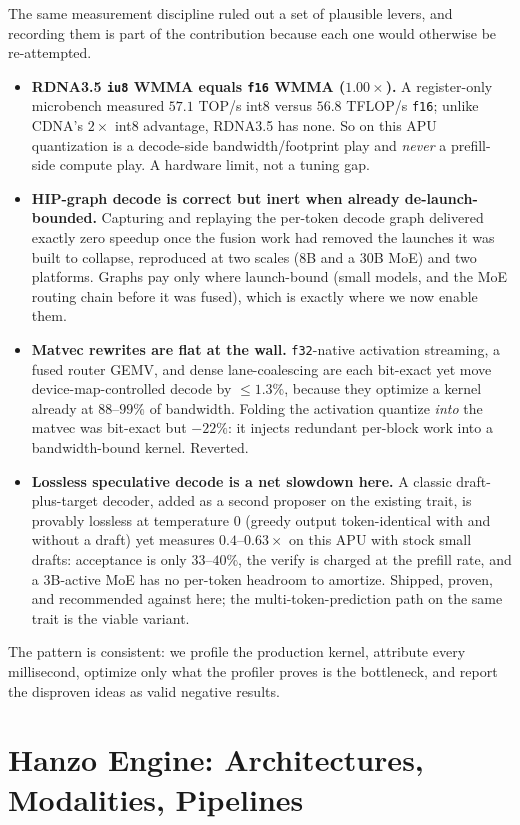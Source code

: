 \documentclass[11pt]{article}
\begin{document}
The same measurement discipline ruled out a set of plausible levers, and recording them is part of
the contribution because each one would otherwise be re-attempted.
\begin{itemize}
  \item \textbf{RDNA3.5 \texttt{iu8} WMMA equals \texttt{f16} WMMA ($1.00\times$).} A register-only
  microbench measured $57.1$ TOP/s int8 versus $56.8$ TFLOP/s \texttt{f16}; unlike CDNA's $2\times$
  int8 advantage, RDNA3.5 has none. So on this APU quantization is a decode-side bandwidth/footprint
  play and \emph{never} a prefill-side compute play. A hardware limit, not a tuning gap.
  \item \textbf{HIP-graph decode is correct but inert when already de-launch-bounded.} Capturing and
  replaying the per-token decode graph delivered exactly zero speedup once the fusion work had removed
  the launches it was built to collapse, reproduced at two scales ($8$B and a $30$B MoE) and two
  platforms. Graphs pay only where launch-bound (small models, and the MoE routing chain before it was
  fused), which is exactly where we now enable them.
  \item \textbf{Matvec rewrites are flat at the wall.} \texttt{f32}-native activation streaming, a
  fused router GEMV, and dense lane-coalescing are each bit-exact yet move device-map-controlled decode
  by $\leq 1.3\%$, because they optimize a kernel already at $88$--$99\%$ of bandwidth. Folding the
  activation quantize \emph{into} the matvec was bit-exact but $-22\%$: it injects redundant per-block
  work into a bandwidth-bound kernel. Reverted.
  \item \textbf{Lossless speculative decode is a net slowdown here.} A classic draft-plus-target
  decoder, added as a second proposer on the existing trait, is provably lossless at temperature $0$
  (greedy output token-identical with and without a draft) yet measures $0.4$--$0.63\times$ on this APU
  with stock small drafts: acceptance is only $33$--$40\%$, the verify is charged at the prefill rate,
  and a $3$B-active MoE has no per-token headroom to amortize. Shipped, proven, and recommended against
  here; the multi-token-prediction path on the same trait is the viable variant.
\end{itemize}
The pattern is consistent: we profile the production kernel, attribute every millisecond, optimize
only what the profiler proves is the bottleneck, and report the disproven ideas as valid negative
results.

\section{Hanzo Engine: Architectures, Modalities, Pipelines}
\label{sec:engine}
\end{document}
